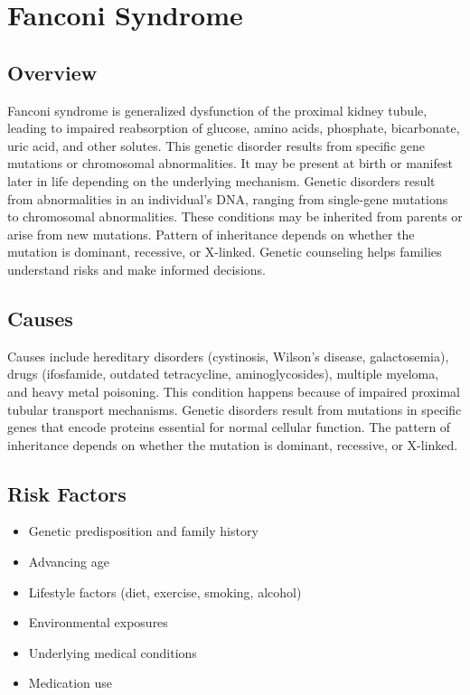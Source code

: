 \chapter{Fanconi Syndrome}
\label{sec:Fanconi Syndrome}

\section{Overview}
Fanconi syndrome is generalized dysfunction of the proximal kidney tubule, leading to impaired reabsorption of glucose, amino acids, phosphate, bicarbonate, uric acid, and other solutes. This genetic disorder results from specific gene mutations or chromosomal abnormalities. It may be present at birth or manifest later in life depending on the underlying mechanism. Genetic disorders result from abnormalities in an individual's DNA, ranging from single-gene mutations to chromosomal abnormalities. These conditions may be inherited from parents or arise from new mutations. Pattern of inheritance depends on whether the mutation is dominant, recessive, or X-linked. Genetic counseling helps families understand risks and make informed decisions.
\section{Causes}
Causes include hereditary disorders (cystinosis, Wilson's disease, galactosemia), drugs (ifosfamide, outdated tetracycline, aminoglycosides), multiple myeloma, and heavy metal poisoning. This condition happens because of impaired proximal tubular transport mechanisms. Genetic disorders result from mutations in specific genes that encode proteins essential for normal cellular function. The pattern of inheritance depends on whether the mutation is dominant, recessive, or X-linked.   
\section{Risk Factors}

\begin{itemize}[noitemsep]
  \item Genetic predisposition and family history
  \item Advancing age
  \item Lifestyle factors (diet, exercise, smoking, alcohol)
  \item Environmental exposures
  \item Underlying medical conditions
  \item Medication use
\end{itemize}
